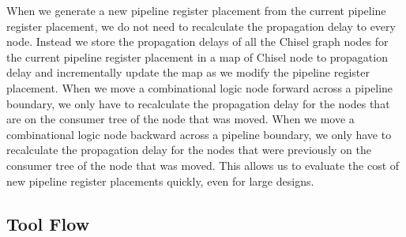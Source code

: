 When we generate a new pipeline register placement from the current pipeline register placement, we do not need to recalculate the propagation delay to every node. Instead we store the propagation delays of all the Chisel graph nodes for the current pipeline register placement in a map of Chisel node to propagation delay and incrementally update the map as we modify the pipeline register placement. When we move a combinational logic node forward across a pipeline boundary, we only have to recalculate the propagation delay for the nodes that are on the consumer tree of the node that was moved. When we move a combinational logic node backward across a pipeline boundary, we only have to recalculate the propagation delay for the nodes that were previously on the consumer tree of the node that was moved. This allows us to evaluate the cost of new pipeline register placements quickly, even for large designs.

\subsection{Tool Flow}

